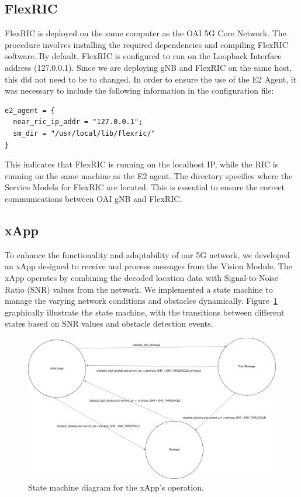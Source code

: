 \subsection{FlexRIC}\label{subsec:flexric}
FlexRIC is deployed on the same computer as the OAI 5G Core Network.
The procedure involves installing the required dependencies and compiling FlexRIC software.
By default, FlexRIC is configured to run on the Loopback Interface address (127.0.0.1).
Since we are deploying gNB and FlexRIC on the same host, this did not need to be to changed.
In order to ensure the use of the E2 Agent, it was necessary to include the following information in the configuration file:

\begin{verbatim}
e2_agent = {
  near_ric_ip_addr = "127.0.0.1";
  sm_dir = "/usr/local/lib/flexric/"
}
\end{verbatim}

This indicates that FlexRIC is running on the localhost IP, while the RIC is running on the same machine as the E2 agent.
The directory specifies where the Service Models for FlexRIC are located.
This is essential to ensure the correct communications between OAI gNB and FlexRIC\@.

\subsection{xApp}\label{subsec:xapp}
To enhance the functionality and adaptability of our 5G network, we developed an xApp designed to receive and process messages from the Vision Module.
The xApp operates by combining the decoded location data with Signal-to-Noise Ratio (SNR) values from the network.
We implemented a state machine to manage the varying network conditions and obstacles dynamically.
Figure~\ref{fig:state_xapp} graphically illustrate the state machine, with the transitions between different states based on SNR values and obstacle detection events.

\begin{figure}[H]
    \centering
    \includegraphics[width=0.5\linewidth]{figures/State_machine.drawio}
    \caption{State machine diagram for the xApp's operation.}
    \label{fig:state_xapp}
\end{figure}



